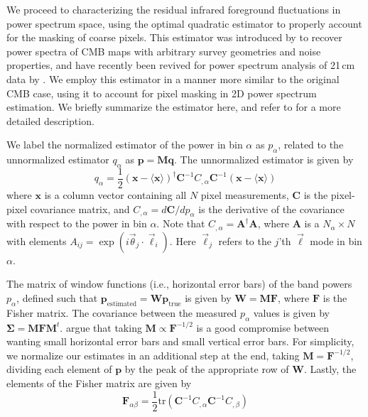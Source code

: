 \documentclass{emulateapj}
\newcommand{\Fb}{\mathbf{F}}
\newcommand{\Mb}{\mathbf{M}}
\newcommand{\Cb}{\mathbf{C}}
\newcommand{\Ab}{\mathbf{A}}
\newcommand{\xb}{\mathbf{x}}
\newcommand{\pb}{\mathbf{p}}
\newcommand{\Wb}{\mathbf{W}}
\begin{document}
We proceed to characterizing the residual infrared foreground fluctuations in power spectrum space, using the optimal quadratic estimator to properly account for the masking of coarse pixels. This estimator was introduced by \citet{Maxpowerspeclossless} to recover power spectra of CMB maps with arbitrary survey geometries and noise properties, and have recently been revived for power spectrum analysis of 21\,cm data by \citet{X13, dillonneben, LT11, DillonFast, ali15}. We employ this estimator in a manner more similar to the original CMB case, using it to account for pixel masking in 2D power spectrum estimation. We briefly summarize the estimator here, and refer to \citet{X13} for a more detailed description.

We label the normalized estimator of the power in bin $\alpha$ as $p_\alpha$, related to the unnormalized estimator $q_\alpha$ as $\mathbf{p} = \Mb \mathbf{q}$. The unnormalized estimator is given by
\begin{equation}
q_\alpha = \frac{1}{2}(\xb-\langle\xb\rangle)^\dagger \Cb^{-1} C_{,\alpha}\Cb^{-1}(\xb-\langle\xb\rangle)
\end{equation}
where $\xb$ is a column vector containing all $N$ pixel measurements, $\Cb$ is the pixel-pixel covariance matrix, and $C_{,\alpha}=d\Cb/dp_\alpha$ is the derivative of the covariance with respect to the power in bin $\alpha$. Note that $C_{,\alpha} = \Ab^\dagger\Ab$, where $\Ab$ is a $N_\alpha\times N$ with elements $A_{ij}=\exp(i\vec{\theta}_j\cdot\vec{\ell}_i)$. Here $\vec{\ell}_j$ refers to the $j$'th $\vec{\ell}$ mode in bin $\alpha$. 

The matrix of window functions (i.e., horizontal error bars) of the band powers $p_\alpha$, defined such that $\pb_\text{estimated}=\Wb\pb_\text{true}$ is given by $\Wb=\Mb\Fb$, where $\Fb$ is the Fisher matrix. The covariance between the measured $p_\alpha$ values is given by $\mathbf{\Sigma} = \Mb\Fb\Mb^t$. \citet{X13} argue that taking $\Mb\propto \Fb^{-1/2}$ is a good compromise between wanting small horizontal error bars and small vertical error bars. For simplicity, we normalize our estimates in an additional step at the end, taking $\Mb=\Fb^{-1/2}$, dividing each element of $\pb$ by the peak of the appropriate row of $\Wb$. Lastly, the elements of the Fisher matrix are given by
\begin{equation}
\Fb_{\alpha\beta}=\frac{1}{2}\text{tr}\left(\Cb^{-1} C_{,\alpha} \Cb^{-1} C_{,\beta} \right)	
\end{equation}
\end{document}
